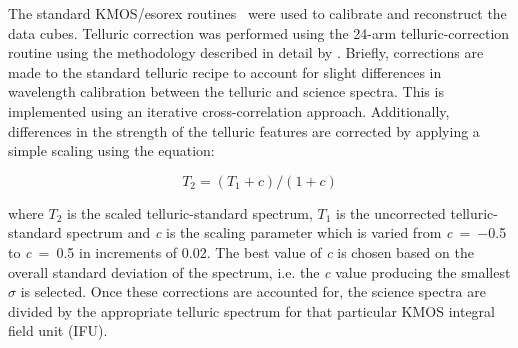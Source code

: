 The standard KMOS/esorex routines~\citep[SPARK;][]{2013A&A...558A..56D} were used to calibrate and reconstruct the data cubes.
Telluric correction was performed using the 24-arm telluric-correction routine using the methodology described in detail by
\citet{2015ApJ...803...14P}.
Briefly, corrections are made to the standard telluric recipe to account for slight differences in wavelength calibration between the telluric and science spectra.
This is implemented using an iterative cross-correlation approach.
Additionally, differences in the strength of the telluric features are corrected by applying a simple scaling using the equation:

\begin{equation}
  T_{2} = (T_{1} + c) / (1 + c)
\end{equation}

\noindent where $T_{2}$ is the scaled telluric-standard spectrum, $T_{1}$ is the uncorrected telluric-standard spectrum and {\it c} is the scaling parameter which is varied from {\it c}~=~$-$0.5 to {\it c}~=~0.5 in increments of 0.02.
The best value of {\it c} is chosen based on the overall standard deviation of the spectrum, i.e. the {\it c} value producing the smallest $\sigma$ is selected.
Once these corrections are accounted for, the science spectra are divided by the appropriate telluric spectrum for that particular KMOS integral field unit (IFU).


